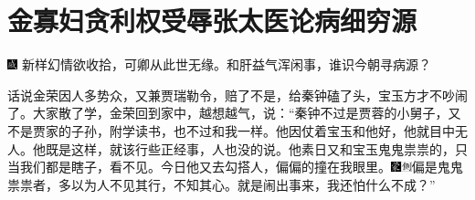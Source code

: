 

\chapter{金寡妇贪利权受辱\hspace{.5em}张太医论病细穷源}

{\includegraphics[width=3mm]{../Images/00005}  \kaishu  新样幻情欲收拾，可卿从此世无缘。和肝益气浑闲事，谁识今朝寻病源？}

话说金荣因人多势众，又兼贾瑞勒令，赔了不是，给秦钟磕了头，宝玉方才不吵闹了。大家散了学，金荣回到家中，越想越气，说：``秦钟不过是贾蓉的小舅子，又不是贾家的子孙，附学读书，也不过和我一样。他因仗着宝玉和他好，他就目中无人。他既是这样，就该行些正经事，人也没的说。他素日又和宝玉鬼鬼祟祟的，只当我们都是瞎子，看不见。今日他又去勾搭人，偏偏的撞在我眼里。{\includegraphics[width=3mm]{../Images/00006}\includegraphics[width=3mm]{../Images/00011}\footnotesize \kaishu 偏是鬼鬼祟祟者，多以为人不见其行，不知其心。}就是闹出事来，我还怕什么不成？''

